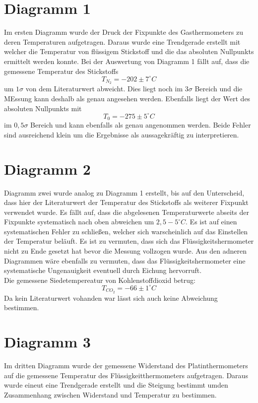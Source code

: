 \section{Diagramm 1}
Im ersten Diagramm wurde der Druck der Fixpunkte des Gasthermometers zu deren Temperaturen aufgetragen.
Daraus wurde eine Trendgerade erstellt mit welcher die Temperatur von flüssigem Stickstoff und die das absoluten Nullpunkts ermittelt werden konnte.
Bei der Auswertung von Diagramm 1 fällt auf, dass die gemessene Temperatur des Stickstoffs
\[T_{N_2} = -202 \pm 7 ^\circ C\]
um $1 \sigma $ von dem Literaturwert abweicht. Dies liegt noch im $3\sigma$ Bereich und die MEssung kann deshalb als genau angesehen werden.
Ebenfalls liegt der Wert des absoluten Nullpunkts mit 
\[T_0= -275 \pm 5 ^\circ C\]
im $0,5 \sigma $ Bereich und kann ebenfalls als genau angenommen werden.
Beide Fehler sind ausreichend klein um die Ergebnisse als aussagekräftig zu interpretieren.

\section{Diagramm 2}

Diagramm zwei wurde analog zu Diagramm 1 erstellt, bis auf den Unterscheid, dass hier der Literaturwert der Temperatur des Stickstoffs als weiterer Fixpunkt verwendet wurde.
Es fällt auf, dass die abgelesenen Temperaturwerte abseits der Fixpunkte systematisch nach oben abweichen um  $2,5-5 ^\circ C$.
Es ist auf einen systematischen Fehler zu schließen, welcher sich warscheinlich auf das Einstellen der Temperatur beläuft. Es ist
zu vermuten, dass sich das Flüssigkeitshermometer nicht zu Ende gesetzt hat bevor die Messung vollzogen wurde. Aus den adneren Diagrammen wäre ebenfalls zu vermuten,
dass das Flüssigkeitshermometer eine systematische Ungenauigkeit eventuell durch Eichung hervorruft.\\

Die gemessene Siedetempereatur von Kohlenstoffdioxid betrug:
\[T_{CO_2}= - 66 \pm 1 ^\circ C\]
Da kein Literaturwert vohanden war lässt sich auch keine Abweichung bestimmen.

\section{Diagramm 3}
Im dritten Diagramm wurde der gemessene Widerstand des Platinthermometers auf die gemessene Temperatur des Flüssigkeitthermometers aufgetragen.
Daraus wurde eineut eine Trendgerade erstellt und die Steigung bestimmt umden Zusammenhang zwischen Widerstand und Temperatur zu bestimmen.

